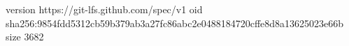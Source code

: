 version https://git-lfs.github.com/spec/v1
oid sha256:9854fdd5312cb59b379ab3a27fc86abc2e0488184720cffe8d8a13625023e66b
size 3682
